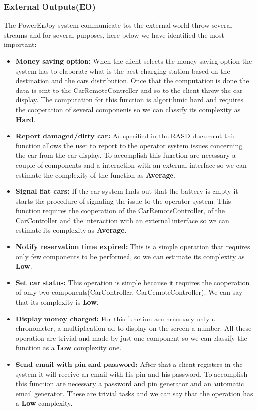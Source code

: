 \subsubsection{External Outputs(EO)}
The PowerEnJoy system communicate tos the external world throw several streams and for several purposes, here below we have identified the most important:
\begin{itemize}
\item \textbf{Money saving option:} When the client selects the money saving option the system has to elaborate what is the best charging station based on the destination  and the cars distribution. Once that the computation is done the data is sent to the CarRemoteController and so to the client throw the car display. The computation for this function is algorithmic hard and requires the cooperation of several components so we can classify its complexity as \textbf{Hard}.
\item \textbf{Report damaged/dirty car:} As specified in the RASD document this function allows the user to report to the operator system issues concerning the car from the car display. To accomplish this function are necessary a couple of components and a interaction with an external interface so we can estimate the complexity of the function as \textbf{Average}.
\item \textbf{Signal flat cars:} If the car system finds out that the battery is empty it starts the procedure of signaling the issue to the operator system. This function requires the cooperation of the CarRemoteController, of the CarController and the interaction with an external interface so we can estimate its complexity as \textbf{Average}.
\item \textbf{Notify reservation time expired:} This is a simple operation that requires  only few components to be performed, so we can estimate its complexity as \textbf{Low}.
\item \textbf{Set car status:} This operation is simple  because it requires the cooperation of only two components(CarController, CarCemoteController). We can say that its complexity is \textbf{Low}.
\item \textbf{Display money charged:} For this function are necessary only a chronometer, a multiplication ad to display on the screen a number. All these operation are trivial and made by just one component so we can classify the function as a \textbf{Low} complexity one.
\item \textbf{Send email with pin and password:} After that a client registers in the system it will receive an email with his pin and his password. To accomplish this function are necessary a password and pin generator and an automatic email generator. These are trivial tasks and we can say that the operation has a \textbf{Low} complexity.
\end{itemize} 
